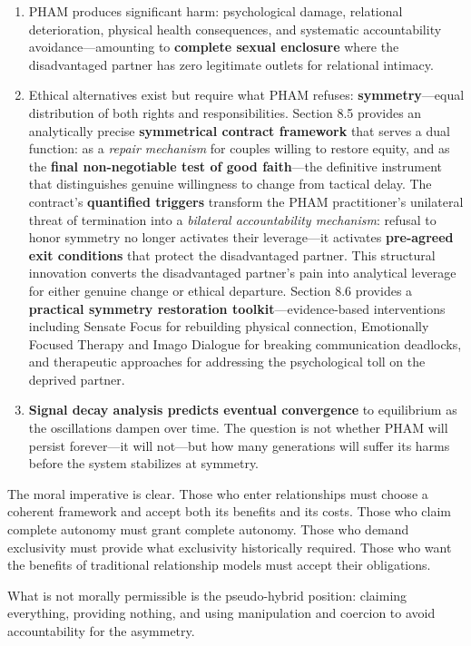 \documentclass[12pt, letterpaper]{article}
\begin{document}
\begin{enumerate}
    \item PHAM produces significant harm: psychological damage, relational deterioration, physical health consequences, and systematic accountability avoidance---amounting to \textbf{complete sexual enclosure} where the disadvantaged partner has zero legitimate outlets for relational intimacy.
    
    \item Ethical alternatives exist but require what PHAM refuses: \textbf{symmetry}---equal distribution of both rights and responsibilities. Section 8.5 provides an analytically precise \textbf{symmetrical contract framework} that serves a dual function: as a \textit{repair mechanism} for couples willing to restore equity, and as the \textbf{final non-negotiable test of good faith}---the definitive instrument that distinguishes genuine willingness to change from tactical delay. The contract's \textbf{quantified triggers} transform the PHAM practitioner's unilateral threat of termination into a \textit{bilateral accountability mechanism}: refusal to honor symmetry no longer activates their leverage---it activates \textbf{pre-agreed exit conditions} that protect the disadvantaged partner. This structural innovation converts the disadvantaged partner's pain into analytical leverage for either genuine change or ethical departure. Section 8.6 provides a \textbf{practical symmetry restoration toolkit}---evidence-based interventions including Sensate Focus for rebuilding physical connection, Emotionally Focused Therapy and Imago Dialogue for breaking communication deadlocks, and therapeutic approaches for addressing the psychological toll on the deprived partner.
    
    \item \textbf{Signal decay analysis predicts eventual convergence} to equilibrium as the oscillations dampen over time. The question is not whether PHAM will persist forever---it will not---but how many generations will suffer its harms before the system stabilizes at symmetry.
\end{enumerate}

The moral imperative is clear. Those who enter relationships must choose a coherent framework and accept both its benefits and its costs. Those who claim complete autonomy must grant complete autonomy. Those who demand exclusivity must provide what exclusivity historically required. Those who want the benefits of traditional relationship models must accept their obligations.

What is not morally permissible is the pseudo-hybrid position: claiming everything, providing nothing, and using manipulation and coercion to avoid accountability for the asymmetry.
\end{document}
